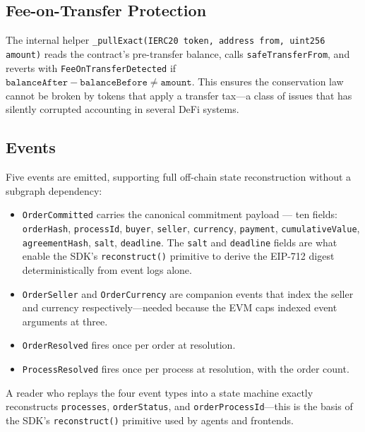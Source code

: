 \documentclass[11pt,a4paper]{article}
\theoremstyle{definition}
\theoremstyle{remark}
\begin{document}
\subsection{Fee-on-Transfer Protection}

The internal helper \texttt{\_pullExact(IERC20 token, address from,
uint256 amount)} reads the contract's pre-transfer balance, calls
\texttt{safeTransferFrom}, and reverts with
\texttt{FeeOnTransferDetected} if
$\texttt{balanceAfter} - \texttt{balanceBefore} \neq
\texttt{amount}$. This ensures the conservation law cannot be broken
by tokens that apply a transfer tax---a class of issues that has
silently corrupted accounting in several DeFi systems.

\subsection{Events}

Five events are emitted, supporting full off-chain state
reconstruction without a subgraph dependency:

\begin{itemize}
  \item \texttt{OrderCommitted} carries the canonical commitment
    payload --- ten fields:
    \texttt{orderHash}, \texttt{processId}, \texttt{buyer},
    \texttt{seller}, \texttt{currency}, \texttt{payment},
    \texttt{cumulativeValue}, \texttt{agreementHash},
    \texttt{salt}, \texttt{deadline}. The \texttt{salt} and
    \texttt{deadline} fields are what enable the SDK's
    \texttt{reconstruct()} primitive to derive the EIP-712 digest
    deterministically from event logs alone.
  \item \texttt{OrderSeller} and \texttt{OrderCurrency} are
    companion events that index the seller and currency
    respectively---needed because the EVM caps indexed event
    arguments at three.
  \item \texttt{OrderResolved} fires once per order at resolution.
  \item \texttt{ProcessResolved} fires once per process at
    resolution, with the order count.
\end{itemize}

A reader who replays the four event types into a state machine
exactly reconstructs \texttt{processes}, \texttt{orderStatus}, and
\texttt{orderProcessId}---this is the basis of the SDK's
\texttt{reconstruct()} primitive used by agents and frontends.

\end{document}
